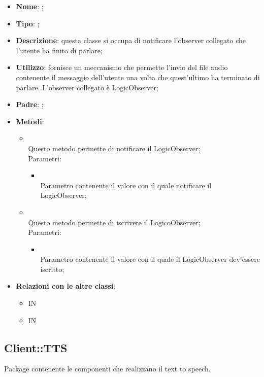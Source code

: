 \begin{itemize}
	\item \textbf{Nome}: ;
	\item \textbf{Tipo}: ;
	\item \textbf{Descrizione}: questa classe si occupa di notificare l'observer collegato che l'utente ha finito di parlare;
	\item \textbf{Utilizzo}: fornisce un meccanismo che permette l'invio del file audio contenente il messaggio dell'utente una volta che quest'ultimo ha terminato di parlare.
L'observer collegato è LogicObserver;
	\item \textbf{Padre}: ;
	\item \textbf{Metodi}:
	\begin{itemize}
		\item[]  \\
		Questo metodo permette di notificare il LogicObserver;\\
		Parametri:
		\begin{itemize}
			\item {} \\
			Parametro contenente il valore con il quale notificare il LogicObserver;
		\end{itemize}
		\item[]  \\
		Questo metodo permette di iscrivere il LogicoObserver;\\
		Parametri:
		\begin{itemize}
			\item {} \\
			Parametro contenente il valore con il quale il LogicObserver dev'essere iscritto;
		\end{itemize}
	\end{itemize}
	\item \textbf{Relazioni con le altre classi}:
	\begin{itemize}
		\item IN \hyperlink{Recorder_label}{}
		\item IN \hyperlink{SpeechEndObservable_label}{}
	\end{itemize}
\end{itemize}
\FloatBarrier

\subsection{Client::TTS}
Package contenente le componenti che realizzano il text to speech.
